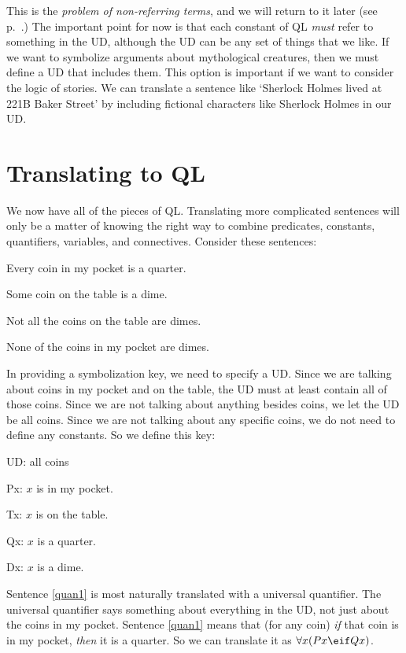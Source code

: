 This is the \emph{problem of non-referring terms}, and we will return to it later (see p.~\pageref{subsec.defdesc}.) The important point for now is that each constant of QL \emph{must} refer to something in the UD, although the UD can be any set of things that we like. If we want to symbolize arguments about mythological creatures, then we must define a UD that includes them. This option is important if we want to consider the logic of stories. We can translate a sentence like `Sherlock Holmes lived at 221B Baker Street' by including fictional characters like Sherlock Holmes in our UD.



\section{Translating to QL}
We now have all of the pieces of QL. Translating more complicated sentences will only be a matter of knowing the right way to combine predicates, constants, quantifiers, variables, and connectives. Consider these sentences:
\begin{earg}
\item[\ex{quan1}] Every coin in my pocket is a quarter.
\item[\ex{quan2}] Some coin on the table is a dime.
\item[\ex{quan3}] Not all the coins on the table are dimes.
\item[\ex{quan4}] None of the coins in my pocket are dimes.
\end{earg}
In providing a symbolization key, we need to specify a UD. Since we are talking about coins in my pocket and on the table, the UD must at least contain all of those coins. Since we are not talking about anything besides coins, we let the UD be all coins. Since we are not talking about any specific coins, we do not need to define any constants. So we define this key:
\begin{ekey}
\item[UD:] all coins
\item[Px:] $x$ is in my pocket.
\item[Tx:] $x$ is on the table.
\item[Qx:] $x$ is a quarter.
\item[Dx:] $x$ is a dime.
\end{ekey}
Sentence \ref{quan1} is most naturally translated with a universal quantifier. The universal quantifier says something about everything in the UD, not just about the coins in my pocket. Sentence \ref{quan1} means that (for any coin) \emph{if} that coin is in my pocket, \emph{then} it is a quarter. So we can translate it as $\forall x(Px \eif Qx)$.

